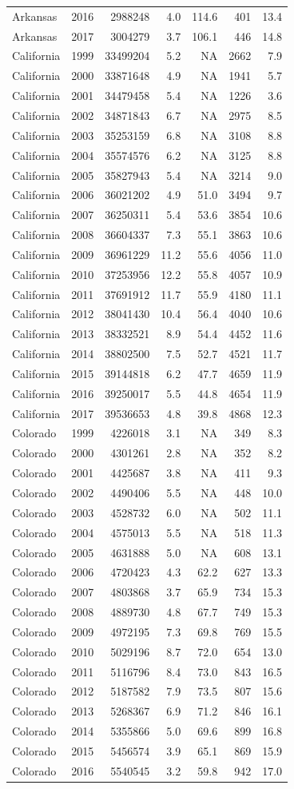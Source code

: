 \documentclass[
]{article}
\begin{document}
\begin{longtable}[]{@{}lrrrrrr@{}}
Arkansas & 2016 & 2988248 & 4.0 & 114.6 & 401 & 13.4\tabularnewline
Arkansas & 2017 & 3004279 & 3.7 & 106.1 & 446 & 14.8\tabularnewline
California & 1999 & 33499204 & 5.2 & NA & 2662 & 7.9\tabularnewline
California & 2000 & 33871648 & 4.9 & NA & 1941 & 5.7\tabularnewline
California & 2001 & 34479458 & 5.4 & NA & 1226 & 3.6\tabularnewline
California & 2002 & 34871843 & 6.7 & NA & 2975 & 8.5\tabularnewline
California & 2003 & 35253159 & 6.8 & NA & 3108 & 8.8\tabularnewline
California & 2004 & 35574576 & 6.2 & NA & 3125 & 8.8\tabularnewline
California & 2005 & 35827943 & 5.4 & NA & 3214 & 9.0\tabularnewline
California & 2006 & 36021202 & 4.9 & 51.0 & 3494 & 9.7\tabularnewline
California & 2007 & 36250311 & 5.4 & 53.6 & 3854 & 10.6\tabularnewline
California & 2008 & 36604337 & 7.3 & 55.1 & 3863 & 10.6\tabularnewline
California & 2009 & 36961229 & 11.2 & 55.6 & 4056 & 11.0\tabularnewline
California & 2010 & 37253956 & 12.2 & 55.8 & 4057 & 10.9\tabularnewline
California & 2011 & 37691912 & 11.7 & 55.9 & 4180 & 11.1\tabularnewline
California & 2012 & 38041430 & 10.4 & 56.4 & 4040 & 10.6\tabularnewline
California & 2013 & 38332521 & 8.9 & 54.4 & 4452 & 11.6\tabularnewline
California & 2014 & 38802500 & 7.5 & 52.7 & 4521 & 11.7\tabularnewline
California & 2015 & 39144818 & 6.2 & 47.7 & 4659 & 11.9\tabularnewline
California & 2016 & 39250017 & 5.5 & 44.8 & 4654 & 11.9\tabularnewline
California & 2017 & 39536653 & 4.8 & 39.8 & 4868 & 12.3\tabularnewline
Colorado & 1999 & 4226018 & 3.1 & NA & 349 & 8.3\tabularnewline
Colorado & 2000 & 4301261 & 2.8 & NA & 352 & 8.2\tabularnewline
Colorado & 2001 & 4425687 & 3.8 & NA & 411 & 9.3\tabularnewline
Colorado & 2002 & 4490406 & 5.5 & NA & 448 & 10.0\tabularnewline
Colorado & 2003 & 4528732 & 6.0 & NA & 502 & 11.1\tabularnewline
Colorado & 2004 & 4575013 & 5.5 & NA & 518 & 11.3\tabularnewline
Colorado & 2005 & 4631888 & 5.0 & NA & 608 & 13.1\tabularnewline
Colorado & 2006 & 4720423 & 4.3 & 62.2 & 627 & 13.3\tabularnewline
Colorado & 2007 & 4803868 & 3.7 & 65.9 & 734 & 15.3\tabularnewline
Colorado & 2008 & 4889730 & 4.8 & 67.7 & 749 & 15.3\tabularnewline
Colorado & 2009 & 4972195 & 7.3 & 69.8 & 769 & 15.5\tabularnewline
Colorado & 2010 & 5029196 & 8.7 & 72.0 & 654 & 13.0\tabularnewline
Colorado & 2011 & 5116796 & 8.4 & 73.0 & 843 & 16.5\tabularnewline
Colorado & 2012 & 5187582 & 7.9 & 73.5 & 807 & 15.6\tabularnewline
Colorado & 2013 & 5268367 & 6.9 & 71.2 & 846 & 16.1\tabularnewline
Colorado & 2014 & 5355866 & 5.0 & 69.6 & 899 & 16.8\tabularnewline
Colorado & 2015 & 5456574 & 3.9 & 65.1 & 869 & 15.9\tabularnewline
Colorado & 2016 & 5540545 & 3.2 & 59.8 & 942 & 17.0\tabularnewline

\end{longtable}
\end{document}
